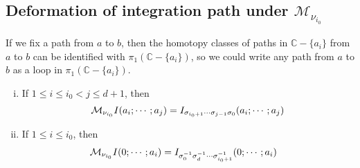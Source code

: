 \subsection{Deformation of integration path under $\mathcal M_{\nu_{i_0}}$}

If we fix a path from $a$ to $b$, then the homotopy classes of paths in $\mathbb C-\{a_i\}$ from $a$ to $b$ can be identified with $\pi_1(\mathbb C-\{a_i\})$, so we could write any path from $a$ to $b$ as a loop in $\pi_1(\mathbb C-\{a_i\})$.

\begin{theorem}\label{thm: monodromy on iterated integrals I}\hfill
\begin{enumerate}[i.]
\item If $1\leq i\leq i_0<j\leq d+1$, then
\begin{equation}\label{eq: M_{i0}I(a_i;...;a_j)}
\mathcal M_{\nu_{i_0}}I(a_i;\cdots;a_j)=I_{\sigma_{i_0+1}\cdots\sigma_{j-1}\sigma_0}(a_i;\cdots;a_j)
\end{equation}
\item If $1\leq i\leq i_0$, then
\begin{equation}\label{eq: M_{i0}I(0;...;a_i)}
\begin{aligned}
\mathcal M_{\nu_{i_0}}I(0;\cdots;a_i)&=I_{\sigma_0^{-1}\sigma_d^{-1}\cdots\sigma_{i_0+1}^{-1}}(0;\cdots;a_i)
\end{aligned}
\end{equation}
\end{enumerate}
\end{theorem}

